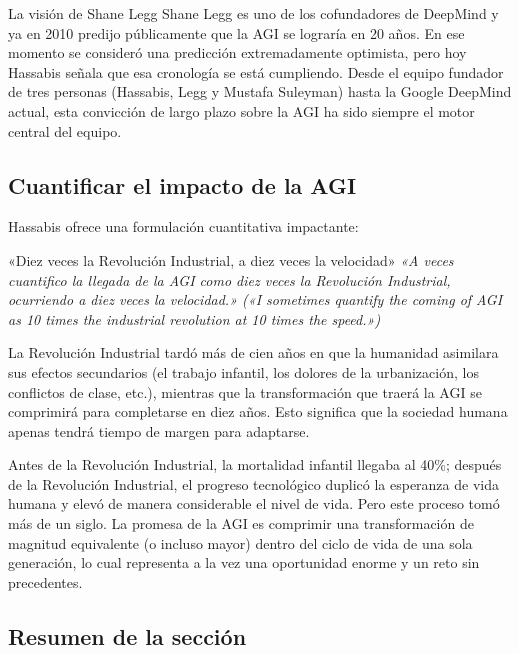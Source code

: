 \documentclass[a4paper]{article}
\begin{document}
\begin{knowledgebox}{La visión de Shane Legg}
Shane Legg es uno de los cofundadores de DeepMind y ya en 2010 predijo públicamente que la AGI se lograría en 20 años. En ese momento se consideró una predicción extremadamente optimista, pero hoy Hassabis señala que esa cronología se está cumpliendo. Desde el equipo fundador de tres personas (Hassabis, Legg y Mustafa Suleyman) hasta la Google DeepMind actual, esta convicción de largo plazo sobre la AGI ha sido siempre el motor central del equipo.
\end{knowledgebox}

\subsection{Cuantificar el impacto de la AGI}

Hassabis ofrece una formulación cuantitativa impactante:

\begin{importantbox}{«Diez veces la Revolución Industrial, a diez veces la velocidad»}
\textit{«A veces cuantifico la llegada de la AGI como diez veces la Revolución Industrial, ocurriendo a diez veces la velocidad.» («I sometimes quantify the coming of AGI as 10 times the industrial revolution at 10 times the speed.»)}

La Revolución Industrial tardó más de cien años en que la humanidad asimilara sus efectos secundarios (el trabajo infantil, los dolores de la urbanización, los conflictos de clase, etc.), mientras que la transformación que traerá la AGI se comprimirá para completarse en diez años. Esto significa que la sociedad humana apenas tendrá tiempo de margen para adaptarse.
\end{importantbox}

Antes de la Revolución Industrial, la mortalidad infantil llegaba al 40\%; después de la Revolución Industrial, el progreso tecnológico duplicó la esperanza de vida humana y elevó de manera considerable el nivel de vida. Pero este proceso tomó más de un siglo. La promesa de la AGI es comprimir una transformación de magnitud equivalente (o incluso mayor) dentro del ciclo de vida de una sola generación, lo cual representa a la vez una oportunidad enorme y un reto sin precedentes.

\subsection{Resumen de la sección}
\end{document}
